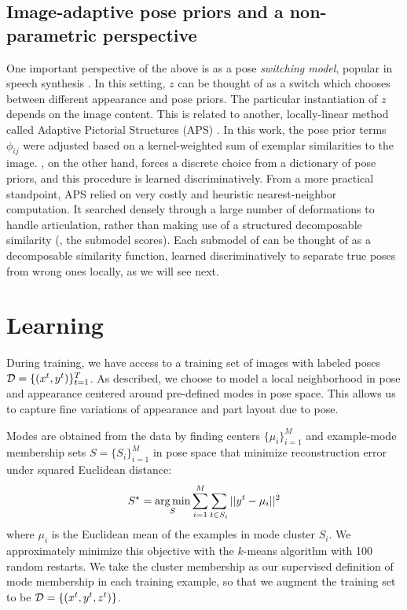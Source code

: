 \subsection{Image-adaptive pose priors and a non-parametric perspective}
One important perspective of the above is as a pose {\em switching model}, 
popular in speech synthesis \citep{rosti2003switching}.  In this setting, $z$ 
can be thought of as a switch which chooses between different appearance and 
pose priors.  The particular instantiation of $z$ depends on the image content.  
This is related to another, locally-linear method called Adaptive Pictorial 
Structures (APS) \citet{sapp2010}.  In this work, the pose prior terms 
$\phi_{ij}$ were adjusted based on a kernel-weighted sum of exemplar 
similarities to the image.  \LLPS, on the other hand, forces a discrete choice 
from a dictionary of pose priors, and this procedure is learned 
discriminatively.  From a more practical standpoint, APS relied on very costly 
and heuristic nearest-neighbor computation.  It searched densely through a 
large number of deformations to handle articulation, rather than making use of 
a structured decomposable similarity (\ie, the \LLPS submodel scores).  Each 
submodel of \LLPS can be thought of as a decomposable similarity function, 
learned discriminatively to separate true poses from wrong ones locally, as we 
will see next.

\section{Learning}\label{sec:llps-learning}

During training, we have access to a training set of images with labeled poses 
$\mathcal{D} = \{(x^{t},y^{t})\}_{t=1}^T$.  As described, we choose to model a local 
neighborhood in pose and appearance centered around pre-defined modes in pose 
space.  This allows us to capture fine variations of appearance and part layout
due to pose.

Modes are obtained from the data by finding centers $\{\mu_i \}_{i=1}^M$ and 
example-mode membership sets $S = \{S_i\}_{i=1}^M$ in pose space that minimize 
reconstruction error under squared Euclidean distance:
\begin{align}
S^\star = \mathop{\arg\min}_{S} \sum_{i=1}^M \sum_{t \in S_i} ||y^{t} - \mu_i||^2
\end{align}
where $\mu_i$ is the Euclidean mean of the examples in mode cluster $S_i$.  We 
approximately minimize this objective with the $k$-means algorithm with 100 
random restarts.  We take the cluster membership as our supervised definition 
of mode membership in each training example, so that we augment the training 
set to be $\mathcal{D} = \{(x^t,y^t,z^t)\}$. 

